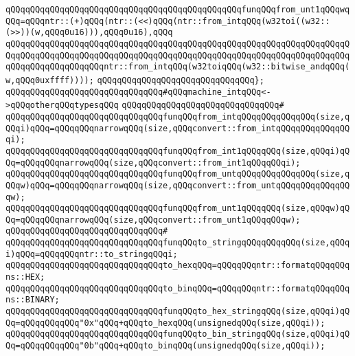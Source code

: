 \verb|qQQqqQQqqQQqqQQqqQQqqQQqqQQqqQQqqQQqqQQqqQQqqQQqfunqQQqfrom_unt1qQQqwqQQq=qQQqntr::(+)qQQq(ntr::(<<)qQQq(ntr::from_intqQQq(w32toi((w32::(>>))(w,qQQq0u16))),qQQq0u16),qQQq|\newline
\verb|qQQqqQQqqQQqqQQqqQQqqQQqqQQqqQQqqQQqqQQqqQQqqQQqqQQqqQQqqQQqqQQqqQQqqQQqqQQqqQQqqQQqqQQqqQQqqQQqqQQqqQQqqQQqqQQqqQQqqQQqqQQqqQQqqQQqqQQqqQQqqQQqqQQqqQQqqQQqqQQqntr::from_intqQQq(w32toiqQQq(w32::bitwise_andqQQq(w,qQQq0uxffff))));|\newline
\verb|qQQqqQQqqQQqqQQqqQQqqQQqqQQqqQQq};|\newline
\newline
\verb|qQQqqQQqqQQqqQQqqQQqqQQqqQQqqQQq#qQQqmachine_intqQQq<->qQQqotherqQQqtypesqQQq|\newline
\verb|qQQqqQQqqQQqqQQqqQQqqQQqqQQqqQQq#|\newline
\verb|qQQqqQQqqQQqqQQqqQQqqQQqqQQqqQQqfunqQQqfrom_intqQQqqQQqqQQqqQQq(size,qQQqi)qQQq=qQQqqQQqnarrowqQQq(size,qQQqconvert::from_intqQQqqQQqqQQqqQQqi);|\newline
\verb|qQQqqQQqqQQqqQQqqQQqqQQqqQQqqQQqfunqQQqfrom_int1qQQqqQQq(size,qQQqi)qQQq=qQQqqQQqnarrowqQQq(size,qQQqconvert::from_int1qQQqqQQqi);|\newline
\verb|qQQqqQQqqQQqqQQqqQQqqQQqqQQqqQQqfunqQQqfrom_untqQQqqQQqqQQqqQQq(size,qQQqw)qQQq=qQQqqQQqnarrowqQQq(size,qQQqconvert::from_untqQQqqQQqqQQqqQQqw);|\newline
\verb|qQQqqQQqqQQqqQQqqQQqqQQqqQQqqQQqfunqQQqfrom_unt1qQQqqQQq(size,qQQqw)qQQq=qQQqqQQqnarrowqQQq(size,qQQqconvert::from_unt1qQQqqQQqw);|\newline
\verb|qQQqqQQqqQQqqQQqqQQqqQQqqQQqqQQq#|\newline
\verb|qQQqqQQqqQQqqQQqqQQqqQQqqQQqqQQqfunqQQqto_stringqQQqqQQqqQQq(size,qQQqi)qQQq=qQQqqQQqntr::to_stringqQQqi;|\newline
\newline
\verb|qQQqqQQqqQQqqQQqqQQqqQQqqQQqqQQqto_hexqQQq=qQQqqQQqntr::formatqQQqqQQqns::HEX;|\newline
\verb|qQQqqQQqqQQqqQQqqQQqqQQqqQQqqQQqto_binqQQq=qQQqqQQqntr::formatqQQqqQQqns::BINARY;|\newline
\newline
\verb|qQQqqQQqqQQqqQQqqQQqqQQqqQQqqQQqfunqQQqto_hex_stringqQQq(size,qQQqi)qQQq=qQQqqQQqqQQq"0x"qQQq+qQQqto_hexqQQq(unsignedqQQq(size,qQQqi));|\newline
\verb|qQQqqQQqqQQqqQQqqQQqqQQqqQQqqQQqfunqQQqto_bin_stringqQQq(size,qQQqi)qQQq=qQQqqQQqqQQq"0b"qQQq+qQQqto_binqQQq(unsignedqQQq(size,qQQqi));|\newline
